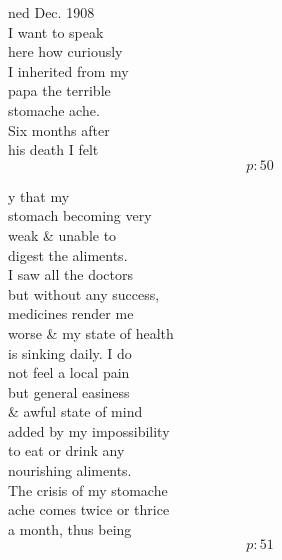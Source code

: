 \documentclass{report}
\begin{document}
	\par{
 	ned Dec. 1908\rbrack\ \\I want to speak\ \\here how curiously\ \\I inherited from my\ \\papa the terrible\ \\stomache ache.\ \\Six months after\ \\his death I felt\ \\
  \[p: 50 \]

	}

	\par{
 	y that my\ \\stomach becoming very\ \\weak \& unable to\ \\digest the aliments.\ \\I saw all the doctors\ \\but without any success,\ \\medicines render me\ \\worse \& my state of health\ \\is sinking daily. I do\ \\not feel a local pain\ \\but general easiness\ \\\& awful state of mind\ \\added by my impossibility\ \\to eat or drink any\ \\nourishing aliments.\ \\The crisis of my stomache\ \\ache comes twice or thrice\ \\a month, thus being\ \\
  \[p: 51 \]

	}
\end{document}
